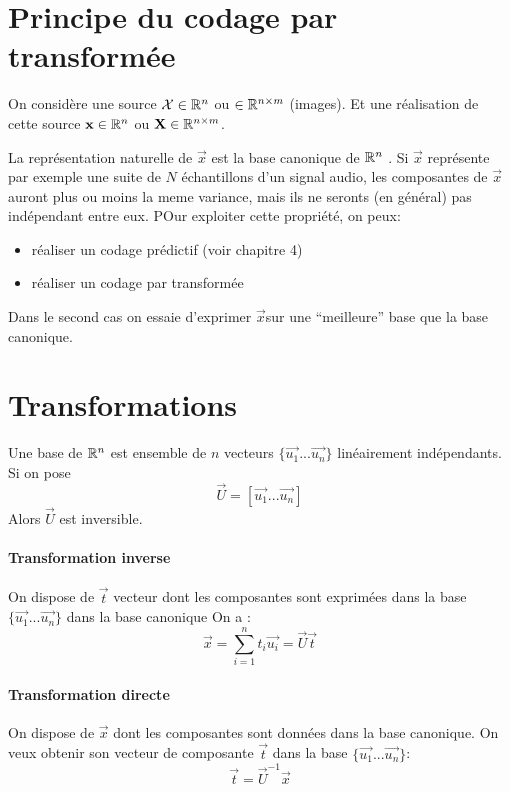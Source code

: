 \documentclass[main.tex]{subfiles}
\begin{document}
\section{Principe du codage par transformée}

On considère une source $\mathbf{\mathcal{X}}\in \mathbb{R}^n$ ou $\in \mathbb{R}^{n\times m}$ (images).
Et une réalisation de cette source $\mathbf{x} \in \mathbb{R}^n$ ou $\mathbf{X}\in\mathbb{R}^{n\times m}$.

La représentation naturelle de $\vec{x}$ est la base canonique
de $\mathbb{R}^n$ .
Si $\vec{x}$ représente par exemple une suite de $N$ échantillons d'un signal audio, les composantes de $\vec{x}$ auront plus ou moins la meme variance, mais ils ne seronts (en général) pas indépendant  entre eux. POur exploiter cette propriété, on peux:
\begin{itemize}
\item réaliser un codage prédictif (voir chapitre 4)
\item réaliser un codage par transformée
\end{itemize}

Dans le second cas on essaie d'exprimer $\vec{x}$sur une ``meilleure'' base que la base canonique.

\section{Transformations}
\begin{prop}
  Une base de $\mathbb{R}^n$ est ensemble de $n$ vecteurs $\{\vec{u_1} ...\vec{u_n}\}$ linéairement indépendants.
  Si on pose
  \[
    \vec{U} = [ \vec{u_1} ... \vec{u_n}]
  \]
  Alors $\vec{U}$ est inversible.
\end{prop}

\paragraph{Transformation inverse}

\begin{defin}
  On dispose de $\vec{t}$ vecteur dont les composantes sont exprimées dans la base $\{\vec{u_1} ... \vec{u_n}\}$ dans la base canonique
    On a :
    \[
      \vec{x}= \sum_{i=1}^{n}t_i\vec{u_i} = \vec{U}\vec{t}
    \]
\end{defin}
\paragraph{Transformation directe}
\begin{defin}
  On dispose de $\vec{x}$ dont les composantes sont données dans la base canonique.
  On veux obtenir son vecteur de composante $\vec{t}$ dans la base $\{\vec{u_1} ... \vec{u_n}\}$:
  \[
    \vec{t} = \vec{U}^{-1}\vec{x}
  \]
\end{defin}
\end{document}
